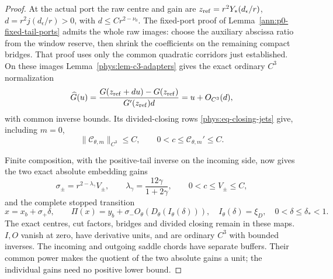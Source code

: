 \begin{proof}
At the actual port the raw centre and gain are
\(z_{\rm ref}=r^2Y_*(d_\epsilon/r)\), \(d=r^2j(d_\epsilon/r)>0\), with
\(d\le Cr^{2-\nu_0}\). The fixed-port proof of
Lemma~\ref{ann:p0-fixed-tail-ports} admits the whole raw images:
choose the auxiliary abscissa ratio from the window reserve, then shrink
the coefficients on the remaining compact bridges. That proof uses only
the common quadratic corridors just established. On these images
Lemma~\ref{phys:lem-c3-adapters}
gives the exact ordinary \(C^3\) normalization
\begin{equation}\label{deg:det-adapter-normalization}
 \widehat G(u)=\frac{G(z_{\rm ref}+du)-G(z_{\rm ref})}
 {G'(z_{\rm ref})d}=u+O_{C^3}(d),
\end{equation}
with common inverse bounds. Its divided-closing rows
\eqref{phys:eq-closing-jets} give, including \(m=0\),
\begin{equation}\label{deg:det-divided-closing}
 \|\mathcal C_{\theta,m}\|_{C^3}\le C,
 \qquad 0<c\le\mathcal C_{\theta,m}'\le C.
\end{equation}

Finite composition, with the positive-tail inverse on the incoming
side, now gives the two exact absolute embedding gains
\begin{equation}\label{sharp:upper-det-scales}
 \sigma_\pm=r^{2-\lambda_\gamma}V_\pm,\qquad
 \lambda_\gamma=\frac{12\gamma}{1+2\gamma},\qquad 0<c\le V_\pm\le C,
\end{equation}
and the complete stopped transition
\begin{equation}\label{sharp:upper-det-composition}
 x=x_b+\sigma_+\delta,\qquad
 \Pi(x)=y_b+\sigma_-O_\theta(D_\theta(I_\theta(\delta))),
 \quad I_\theta(\delta)=\xi_D,\quad 0<\delta\le\delta_*<1.
\end{equation}
The exact centres, cut factors, bridges and divided closing remain in
these maps. \(I,O\) vanish at zero, have derivative units, and are
ordinary \(C^3\) with bounded inverses. The incoming and outgoing saddle
chords have separate buffers. Their common power makes the quotient of
the two absolute gains a unit; the individual gains need no positive
lower bound.


\end{proof}

